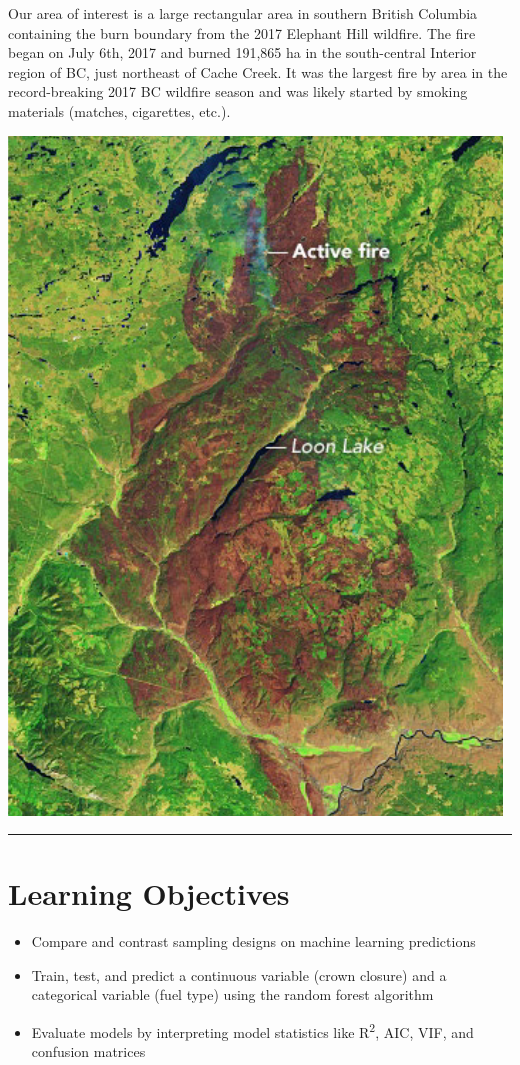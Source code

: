\documentclass[
]{book}
\begin{document}
Our area of interest is a large rectangular area in southern British Columbia containing the burn boundary from the 2017 Elephant Hill wildfire. The fire began on July 6th, 2017 and burned 191,865 ha in the south-central Interior region of BC, just northeast of Cache Creek. It was the largest fire by area in the record-breaking 2017 BC wildfire season and was likely started by smoking materials (matches, cigarettes, etc.).

\includegraphics[width=0.75\linewidth]{images/04-elephant-hill-fire}

\begin{center}\rule{0.5\linewidth}{0.5pt}\end{center}

\hypertarget{learning-objectives-3}{%
\section*{Learning Objectives}\label{learning-objectives-3}}

\begin{itemize}
\item
  Compare and contrast sampling designs on machine learning predictions
\item
  Train, test, and predict a continuous variable (crown closure) and a categorical variable (fuel type) using the random forest algorithm
\item
  Evaluate models by interpreting model statistics like R\textsuperscript{2}, AIC, VIF, and confusion matrices
\end{itemize}
\end{document}
